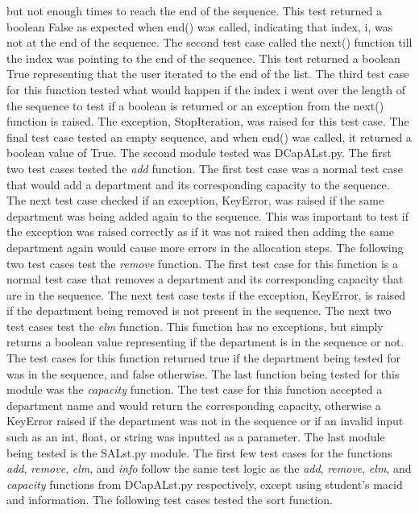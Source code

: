 \documentclass[12pt]{article}
\begin{document}
but not enough times to reach the end of the sequence. This test returned a boolean False as expected when end() was called, indicating that index, i, was not at the end of the sequence. The second test case called the next() function
till the index was pointing to the end of the sequence. This test returned a boolean True representing that the user iterated to the end of the list. The third test case for this function
tested what would happen if the index i went over the length of the sequence to test if a boolean is returned or an exception from the next() function is raised. The exception, StopIteration, was raised for this test case.
The final test case tested an empty sequence, and when end() was called, it returned a boolean value of True. The second module tested was DCapALst.py. The first two test cases tested the \textit{add} function. The first test case was a normal
test case that would add a department and its corresponding capacity to the sequence. The next test case checked if an exception, KeyError, was raised if the same department was being added again to the sequence. This was important to test if the 
exception was raised correctly as if it was not raised then adding the same department again would cause more errors in the allocation steps. The following two test cases test the \textit{remove} function.
The first test case for this function is a normal test case that removes a department and its corresponding capacity that are in the sequence. The next test case tests if the exception, KeyError, is 
raised if the department being removed is not present in the sequence. The next two test cases test the \textit{elm} function. This function has no exceptions, but simply returns a boolean value representing if 
the department is in the sequence or not. The test cases for this function returned true if the department being tested for was in the sequence, and false otherwise. The last function being tested for this module was the 
\textit{capacity} function. The test case for this function accepted a department name and would return the corresponding capacity, otherwise a KeyError raised if the department was not in the sequence or if an invalid input
such as an int, float, or string was inputted as a parameter. The last module being tested is the SALst.py module. The first few test cases for the functions \textit{add}, \textit{remove}, \textit{elm}, and \textit{info} follow
the same test logic as the \textit{add}, \textit{remove}, \textit{elm}, and \textit{capacity} functions from DCapALst.py respectively, except using student's macid and information. The following test cases tested the sort function.
\end{document}
